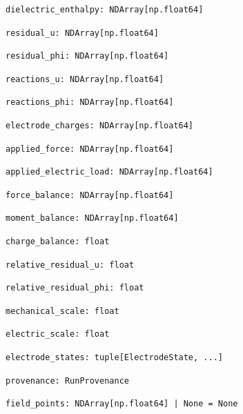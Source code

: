 \begin{lstlisting}
dielectric_enthalpy: NDArray[np.float64]
\end{lstlisting}
\begin{lstlisting}
residual_u: NDArray[np.float64]
\end{lstlisting}
\begin{lstlisting}
residual_phi: NDArray[np.float64]
\end{lstlisting}
\begin{lstlisting}
reactions_u: NDArray[np.float64]
\end{lstlisting}
\begin{lstlisting}
reactions_phi: NDArray[np.float64]
\end{lstlisting}
\begin{lstlisting}
electrode_charges: NDArray[np.float64]
\end{lstlisting}
\begin{lstlisting}
applied_force: NDArray[np.float64]
\end{lstlisting}
\begin{lstlisting}
applied_electric_load: NDArray[np.float64]
\end{lstlisting}
\begin{lstlisting}
force_balance: NDArray[np.float64]
\end{lstlisting}
\begin{lstlisting}
moment_balance: NDArray[np.float64]
\end{lstlisting}
\begin{lstlisting}
charge_balance: float
\end{lstlisting}
\begin{lstlisting}
relative_residual_u: float
\end{lstlisting}
\begin{lstlisting}
relative_residual_phi: float
\end{lstlisting}
\begin{lstlisting}
mechanical_scale: float
\end{lstlisting}
\begin{lstlisting}
electric_scale: float
\end{lstlisting}
\begin{lstlisting}
electrode_states: tuple[ElectrodeState, ...]
\end{lstlisting}
\begin{lstlisting}
provenance: RunProvenance
\end{lstlisting}
\begin{lstlisting}
field_points: NDArray[np.float64] | None = None
\end{lstlisting}
